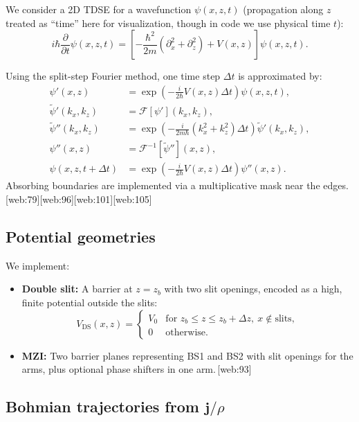 \documentclass[11pt]{article}
\begin{document}
We consider a 2D TDSE for a wavefunction \(\psi(x,z,t)\) (propagation along \(z\) treated as ``time'' here for visualization, though in code we use physical time \(t\)):
\begin{equation}
i\hbar\frac{\partial}{\partial t} \psi(x,z,t)
= \left[-\frac{\hbar^2}{2m}(\partial_x^2 + \partial_z^2) + V(x,z)\right]\psi(x,z,t).
\end{equation}

Using the split-step Fourier method, one time step \(\Delta t\) is approximated by:
\begin{align}
\psi'(x,z) &= \exp\left(-\frac{i}{2\hbar}V(x,z)\Delta t\right)\psi(x,z,t),\\
\tilde{\psi}'(k_x,k_z) &= \mathcal{F}[\psi'](k_x,k_z),\\
\tilde{\psi}''(k_x,k_z) &= \exp\left(-\frac{i}{2m\hbar} (k_x^2+k_z^2)\Delta t\right)\tilde{\psi}'(k_x,k_z),\\
\psi''(x,z) &= \mathcal{F}^{-1}[\tilde{\psi}''](x,z),\\
\psi(x,z,t+\Delta t) &= \exp\left(-\frac{i}{2\hbar}V(x,z)\Delta t\right)\psi''(x,z).\label{eq:split-step}
\end{align}
Absorbing boundaries are implemented via a multiplicative mask near the edges.\,[web:79][web:96][web:101][web:105]

\subsection{Potential geometries}

We implement:

\begin{itemize}[leftmargin=*]
  \item \textbf{Double slit:} A barrier at \(z=z_b\) with two slit openings, encoded as a high, finite potential outside the slits:
  \[
  V_{\text{DS}}(x,z) =
  \begin{cases}
    V_0 & \text{for } z_b \le z \le z_b+\Delta z,~x \notin \text{slits},\\
    0 & \text{otherwise.}
  \end{cases}
  \]

  \item \textbf{MZI:} Two barrier planes representing BS1 and BS2 with slit openings for the arms, plus optional phase shifters in one arm.\,[web:93]
\end{itemize}

\subsection{Bohmian trajectories from \(\mathbf j/\rho\)}
\end{document}
